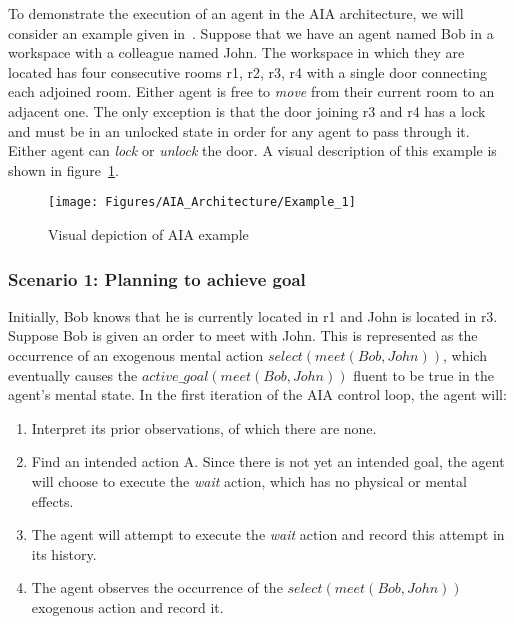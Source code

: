 To demonstrate the execution of an agent in the AIA architecture, we will consider an example given in~\cite{blount_architecture_2013}.
Suppose that we have an agent named Bob in a workspace with a colleague named John.
The workspace in which they are located has four consecutive rooms r1, r2, r3, r4 with a single door connecting each adjoined room.
Either agent is free to \textit{move} from their current room to an adjacent one.
The only exception is that the door joining r3 and r4 has a lock and must be in an unlocked state in order for any agent to pass through it.
Either agent can \textit{lock} or \textit{unlock} the door.
A visual description of this example is shown in figure~\ref{fig:aia_example}.

\begin{figure}
    \centering
    \texttt{[image: Figures/AIA\_Architecture/Example\_1]}
    \caption{Visual depiction of AIA example}
    \label{fig:aia_example}
\end{figure}

\subsubsection{Scenario 1: Planning to achieve goal~\cite{blount_towards_2014}}
\label{subsubsec:aia_scenario_1}

Initially, Bob knows that he is currently located in r1 and John is located in r3.
Suppose Bob is given an order to meet with John.
This is represented as the occurrence of an exogenous mental action $select(meet(Bob, John))$, which eventually causes the $active\_goal(meet(Bob, John))$ fluent to be true in the agent's mental state.
In the first iteration of the AIA control loop, the agent will:

\begin{enumerate}
    \item Interpret its prior observations, of which there are none.
    \item Find an intended action A.
        Since there is not yet an intended goal, the agent will choose to execute the \textit{wait} action, which has no physical or mental effects.
    \item The agent will attempt to execute the \textit{wait} action and record this attempt in its history.
    \item The agent observes the occurrence of the $select(meet(Bob, John))$ exogenous action and record it.
\end{enumerate}

